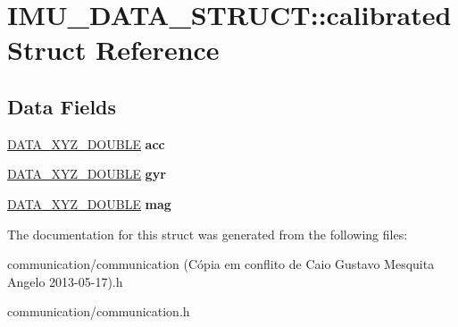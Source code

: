 \hypertarget{structIMU__DATA__STRUCT_1_1calibrated}{
\section{IMU\_\-DATA\_\-STRUCT::calibrated Struct Reference}
\label{structIMU__DATA__STRUCT_1_1calibrated}
}
\subsection*{Data Fields}
\begin{DoxyCompactItemize}
\item 
\hypertarget{structIMU__DATA__STRUCT_1_1calibrated_a281a7fdb40a05ed97388f18b9bb90c81}{
\hyperlink{structDATA__XYZ__DOUBLE}{DATA\_\-XYZ\_\-DOUBLE} {\bfseries acc}}
\label{structIMU__DATA__STRUCT_1_1calibrated_a281a7fdb40a05ed97388f18b9bb90c81}

\item 
\hypertarget{structIMU__DATA__STRUCT_1_1calibrated_a8a54aded6ce608f1b7d2b4a0c52c248b}{
\hyperlink{structDATA__XYZ__DOUBLE}{DATA\_\-XYZ\_\-DOUBLE} {\bfseries gyr}}
\label{structIMU__DATA__STRUCT_1_1calibrated_a8a54aded6ce608f1b7d2b4a0c52c248b}

\item 
\hypertarget{structIMU__DATA__STRUCT_1_1calibrated_a2fde6c6759e0fda17e272c32096cb9ec}{
\hyperlink{structDATA__XYZ__DOUBLE}{DATA\_\-XYZ\_\-DOUBLE} {\bfseries mag}}
\label{structIMU__DATA__STRUCT_1_1calibrated_a2fde6c6759e0fda17e272c32096cb9ec}

\end{DoxyCompactItemize}


The documentation for this struct was generated from the following files:\begin{DoxyCompactItemize}
\item 
communication/communication (Cópia em conflito de Caio Gustavo Mesquita Angelo 2013-\/05-\/17).h\item 
communication/communication.h\end{DoxyCompactItemize}
